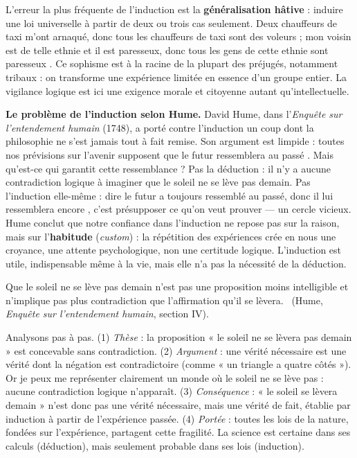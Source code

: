 \documentclass[11pt]{article}
\begin{document}
\begin{attention}
L'erreur la plus fréquente de l'induction est la \textbf{généralisation hâtive} : induire une loi universelle à partir de deux ou trois cas seulement. \guillemotleft Deux chauffeurs de taxi m'ont arnaqué, donc tous les chauffeurs de taxi sont des voleurs \guillemotright ; \guillemotleft mon voisin est de telle ethnie et il est paresseux, donc tous les gens de cette ethnie sont paresseux \guillemotright. Ce sophisme est à la racine de la plupart des préjugés, notamment tribaux : on transforme une expérience limitée en essence d'un groupe entier. La vigilance logique est ici une exigence morale et citoyenne autant qu'intellectuelle.
\end{attention}

\textbf{Le problème de l'induction selon Hume.} David Hume, dans l'\emph{Enquête sur l'entendement humain} (1748), a porté contre l'induction un coup dont la philosophie ne s'est jamais tout à fait remise. Son argument est limpide : toutes nos prévisions sur l'avenir supposent que \guillemotleft le futur ressemblera au passé \guillemotright. Mais qu'est-ce qui garantit cette ressemblance ? Pas la déduction : il n'y a aucune contradiction logique à imaginer que le soleil ne se lève pas demain. Pas l'induction elle-même : dire \guillemotleft le futur a toujours ressemblé au passé, donc il lui ressemblera encore \guillemotright, c'est présupposer ce qu'on veut prouver — un cercle vicieux. Hume conclut que notre confiance dans l'induction ne repose pas sur la raison, mais sur l'\textbf{habitude} (\emph{custom}) : la répétition des expériences crée en nous une croyance, une attente psychologique, non une certitude logique. L'induction est utile, indispensable même à la vie, mais elle n'a pas la nécessité de la déduction.

\begin{experience}
\guillemotleft Que le soleil ne se lève pas demain n'est pas une proposition moins intelligible et n'implique pas plus contradiction que l'affirmation qu'il se lèvera. \guillemotright\ (Hume, \emph{Enquête sur l'entendement humain}, section IV).

Analysons pas à pas. (1) \emph{Thèse} : la proposition « le soleil ne se lèvera pas demain » est concevable sans contradiction. (2) \emph{Argument} : une vérité nécessaire est une vérité dont la négation est contradictoire (comme « un triangle a quatre côtés »). Or je peux me représenter clairement un monde où le soleil ne se lève pas : aucune contradiction logique n'apparaît. (3) \emph{Conséquence} : « le soleil se lèvera demain » n'est donc pas une vérité nécessaire, mais une vérité de fait, établie par induction à partir de l'expérience passée. (4) \emph{Portée} : toutes les lois de la nature, fondées sur l'expérience, partagent cette fragilité. La science est certaine dans ses calculs (déduction), mais seulement probable dans ses lois (induction).
\end{experience}
\end{document}
